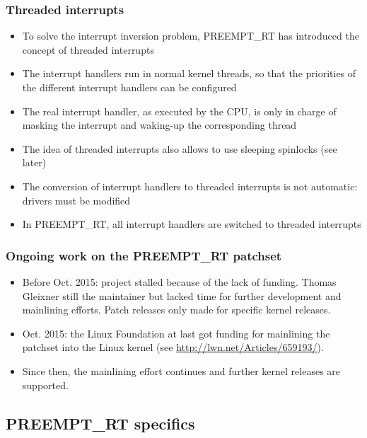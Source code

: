 \begin{frame}
  \frametitle{Threaded interrupts}
  \begin{itemize}
  \item To solve the interrupt inversion problem, PREEMPT\_RT has
    introduced the concept of threaded interrupts
  \item The interrupt handlers run in normal kernel threads, so that
    the priorities of the different interrupt handlers can be
    configured
  \item The real interrupt handler, as executed by the CPU, is only in
    charge of masking the interrupt and waking-up the corresponding
    thread
  \item The idea of threaded interrupts also allows to use sleeping
    spinlocks (see later)
  \item The conversion of interrupt handlers to
    threaded interrupts is not automatic: drivers must be modified
  \item In PREEMPT\_RT, all interrupt handlers are switched to
    threaded interrupts
  \end{itemize}
\end{frame}

\begin{frame}
  \frametitle{Ongoing work on the PREEMPT\_RT patchset}
  \begin{itemize}
  \item Before Oct. 2015: project stalled because of the lack of funding.
        Thomas Gleixner still the maintainer but lacked time for further
        development and mainlining efforts. Patch releases only made
        for specific kernel releases.
  \item Oct. 2015: the Linux Foundation at last got funding
        for mainlining the patchset into the Linux kernel (see
        \url{http://lwn.net/Articles/659193/}).
  \item Since then, the mainlining effort continues and further kernel
        releases are supported.
  \end{itemize}
\end{frame}

\subsection{PREEMPT\_RT specifics}

